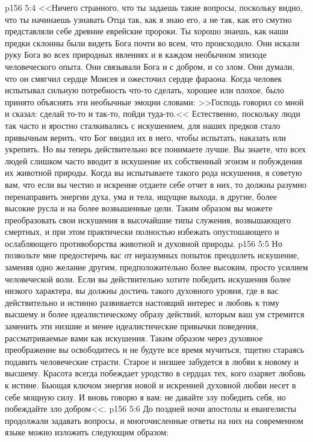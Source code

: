 \vs p156 5:4 <<Ничего странного, что ты задаешь такие вопросы, поскольку видно, что ты начинаешь узнавать Отца так, как я знаю его, а не так, как его смутно представляли себе древние еврейские пророки. Ты хорошо знаешь, как наши предки склонны были видеть Бога почти во всем, что происходило. Они искали руку Бога во всех природных явлениях и в каждом необычном эпизоде человеческого опыта. Они связывали Бога и с добром, и со злом. Они думали, что он смягчил сердце Моисея и ожесточил сердце фараона. Когда человек испытывал сильную потребность что\hyp{}то сделать, хорошее или плохое, было принято объяснять эти необычные эмоции словами: >>Господь говорил со мной и сказал: сделай то\hyp{}то и так\hyp{}то, пойди туда\hyp{}то.<< Естественно, поскольку люди так часто и яростно сталкивались с искушением, для наших предков стало привычным верить, что Бог вводил их в него, чтобы испытать, наказать или укрепить. Но вы теперь действительно все понимаете лучше. Вы знаете, что всех людей слишком часто вводит в искушение их собственный эгоизм и побуждения их животной природы. Когда вы испытываете такого рода искушения, я советую вам, что если вы честно и искренне отдаете себе отчет в них, то должны разумно перенаправить энергии духа, ума и тела, ищущие выхода, в другие, более высокие русла и на более возвышенные цели. Таким образом вы можете преобразовать свои искушения в высочайшие типы служения, возвышающего смертных, и при этом практически полностью избежать опустошающего и ослабляющего противоборства животной и духовной природы.
\vs p156 5:5 Но позвольте мне предостеречь вас от неразумных попыток преодолеть искушение, заменяя одно желание другим, предположительно более высоким, просто усилием человеческой воли. Если вы действительно хотите победить искушения более низкого характера, вы должны достичь такого духовного уровня, где в вас действительно и истинно развивается настоящий интерес и любовь к тому высшему и более идеалистическому образу действий, которым ваш ум стремится заменить эти низшие и менее идеалистические привычки поведения, рассматриваемые вами как искушения. Таким образом через духовное преображение вы освободитесь и не будуте все время мучиться, тщетно стараясь подавить человеческие страсти. Старое и низшее забудется в любви к новому и высшему. Красота всегда побеждает уродство в сердцах тех, кого озаряет любовь к истине. Бьющая ключом энергия новой и искренней духовной любви несет в себе мощную силу. И вновь говорю я вам: не давайте злу победить себя, но побеждайте зло добром<<.
\vs p156 5:6 До поздней ночи апостолы и евангелисты продолжали задавать вопросы, и многочисленные ответы на них на современном языке можно изложить следующим образом:
